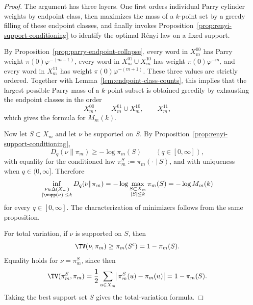 \begin{proof}
The argument has three layers. One first orders individual Parry cylinder
weights by endpoint class, then maximizes the mass of a \(k\)-point set by a
greedy filling of these endpoint classes, and finally invokes
Proposition~\ref{prop:renyi-support-conditioning} to identify the optimal
R\'enyi law on a fixed support.

By Proposition~\ref{prop:parry-endpoint-collapse}, every word in \(X_m^{00}\) has
Parry weight \(\pi(0)\varphi^{-(m-1)}\), every word in \(X_m^{01}\cup X_m^{10}\)
has weight \(\pi(0)\varphi^{-m}\), and every word in \(X_m^{11}\) has weight
\(\pi(0)\varphi^{-(m+1)}\). These three values are strictly ordered. Together
with Lemma~\ref{lem:endpoint-class-counts}, this implies that the largest
possible Parry mass of a \(k\)-point subset is obtained greedily by exhausting
the endpoint classes in the order
\[
X_m^{00},\qquad X_m^{01}\cup X_m^{10},\qquad X_m^{11},
\]
which gives the formula for \(M_m(k)\).

Now let \(S\subset X_m\) and let \(\nu\) be supported on \(S\). By
Proposition~\ref{prop:renyi-support-conditioning},
\[
D_q(\nu\|\pi_m)
\ge
-\log \pi_m(S)
\qquad (q\in[0,\infty]),
\]
with equality for the conditioned law \(\pi_m^S:=\pi_m(\cdot\mid S)\), and
with uniqueness when \(q\in(0,\infty]\). Therefore
\[
\inf_{\substack{\nu\in\Delta(X_m)\\ |\supp(\nu)|\le k}}D_q(\nu\|\pi_m)
=
-\log\max_{\substack{S\subset X_m\\ |S|\le k}}\pi_m(S)
=
-\log M_m(k)
\]
for every \(q\in[0,\infty]\). The characterization of minimizers follows from
the same proposition.

For total variation, if \(\nu\) is supported on \(S\), then
\[
\TV(\nu,\pi_m)
\ge
\pi_m(S^c)
=
1-\pi_m(S).
\]
Equality holds for \(\nu=\pi_m^S\), since then
\[
\TV(\pi_m^S,\pi_m)
=
\frac12\sum_{u\in X_m}\bigl|\pi_m^S(u)-\pi_m(u)\bigr|
=
1-\pi_m(S).
\]
Taking the best support set \(S\) gives the total-variation formula.
\end{proof}

